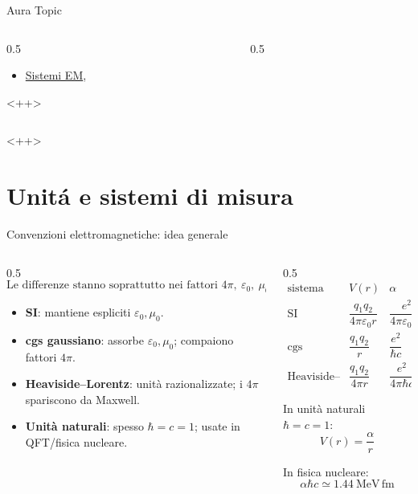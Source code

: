 \begin{frame}{Aura Topic}
    \begin{columns}[T]
        \begin{column}{0.5\textwidth}
            \begin{itemize}
                \item \hyperlink{EMsystems}{Sistemi EM},  
            \end{itemize}<++>
        \end{column}
        \begin{column}{0.5\textwidth}
            
        \end{column}
    \end{columns}
    <++>
\end{frame}

\section{Unit\'a e sistemi di misura}

\begin{frame}{Convenzioni elettromagnetiche: idea generale}
    \begin{columns}[T]
        \begin{column}{0.5\textwidth}
\small
\[
\boxed{\text{Le differenze stanno soprattutto nei fattori }4\pi,\ \varepsilon_0,\ \mu_0,\ c}
\]

\begin{itemize}
  \item \textbf{SI}: mantiene espliciti \(\varepsilon_0,\mu_0\).
  \item \textbf{cgs gaussiano}: assorbe \(\varepsilon_0,\mu_0\); compaiono fattori \(4\pi\).
  \item \textbf{Heaviside--Lorentz}: unità razionalizzate; i \(4\pi\) spariscono da Maxwell.
  \item \textbf{Unità naturali}: spesso \(\hbar=c=1\); usate in QFT/fisica nucleare.
\end{itemize}
        \end{column}
        \begin{column}{0.5\textwidth}
\small
\[
\begin{array}{c|c|c}
\text{sistema} & V(r) & \alpha \\ \hline
\text{SI} &
\dfrac{q_1q_2}{4\pi\varepsilon_0 r} &
\dfrac{e^2}{4\pi\varepsilon_0\hbar c}
\\[3mm]
\text{cgs gaussiano} &
\dfrac{q_1q_2}{r} &
\dfrac{e^2}{\hbar c}
\\[3mm]
\text{Heaviside--Lorentz} &
\dfrac{q_1q_2}{4\pi r} &
\dfrac{e^2}{4\pi\hbar c}
\end{array}
\]

In unità naturali \(\hbar=c=1\):
\[
\boxed{
V(r)=\frac{\alpha}{r}
}
\]

In fisica nucleare:
\[
\boxed{
\alpha\hbar c \simeq 1.44\ \mathrm{MeV\,fm}
}
\]
            
        \end{column}
    \end{columns}
    
\end{frame}

